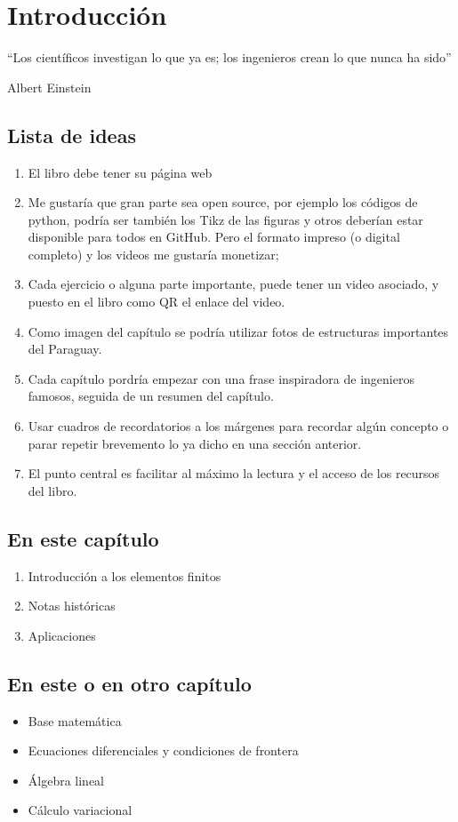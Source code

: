 
\setchapterpreamble[u]{\margintoc}


\chapter{Introducción} \label{chap:intro}

\begin{kaobox}
	``Los científicos investigan lo que ya es; los ingenieros crean lo que nunca ha sido”
\begin{flushright}
	Albert Einstein
\end{flushright}
\end{kaobox}


\section{Lista de ideas}

\begin{enumerate}
	\item El libro debe tener su página web
	\item Me gustaría que gran parte sea open source, por ejemplo los códigos de python, podría ser también los Tikz de las figuras y otros deberían estar disponible para todos en GitHub. Pero el formato impreso (o digital completo) y los videos me gustaría monetizar;
	\item Cada ejercicio o alguna parte importante, puede tener un video asociado, y puesto en el libro como QR el enlace del video.
	\item Como imagen del capítulo se podría utilizar fotos de estructuras importantes del Paraguay.
	\item Cada capítulo pordría empezar con una frase inspiradora de ingenieros famosos, seguida de un resumen del capítulo.
	\item Usar cuadros de recordatorios a los márgenes para recordar algún concepto o parar repetir brevemento lo ya dicho en una sección anterior.
	\item El punto central es facilitar al máximo la lectura y el acceso de los recursos del libro.
\end{enumerate}


\section{En este capítulo}

\begin{enumerate}
	\item Introducción a los elementos finitos
	\item Notas históricas
	\item Aplicaciones
\end{enumerate}

\section{En este o en otro capítulo}

\begin{itemize}
	\item Base matemática
	\item Ecuaciones diferenciales y condiciones de frontera
	\item Álgebra lineal
	\item Cálculo variacional
\end{itemize}